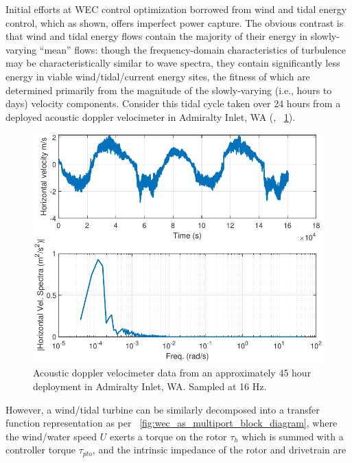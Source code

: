 \documentclass[lettersize,journal]{IEEEtran}
\begin{document}

Initial efforts at WEC control optimization borrowed from wind and tidal energy control, which as shown, offers imperfect power capture.
The obvious contrast is that wind and tidal energy flows contain the majority of their energy in slowly-varying ``mean'' flows: though the frequency-domain characteristics of turbulence may be characteristically similar to wave spectra, they contain significantly less energy in viable wind/tidal/current energy sites, the fitness of which are determined primarily from the magnitude of the slowly-varying (i.e., hours to days) velocity components.
Consider this tidal cycle taken over 24 hours from a deployed acoustic doppler velocimeter in Admiralty Inlet, WA (\cite{NREL2015}, \figurename~\ref{fig: TidalVelocity}).

\begin{figure}
        \centering \includegraphics[width=\columnwidth]{TidalVelocity.pdf}
        \caption{Acoustic doppler velocimeter data from an approximately 45 hour deployment in Admiralty Inlet, WA.
        Sampled at 16 Hz.}
        \label{fig: TidalVelocity}
\end{figure}

However, a wind/tidal turbine can be similarly decomposed into a transfer function representation as per \figurename~\ref{fig:wec_as_multiport_block_diagram}, where the wind/water speed $U$ exerts a torque on the rotor $\tau_h$ which is summed with a controller torque $\tau_{pto}$, and the intrinsic impedance of the rotor and drivetrain are
\end{document}
